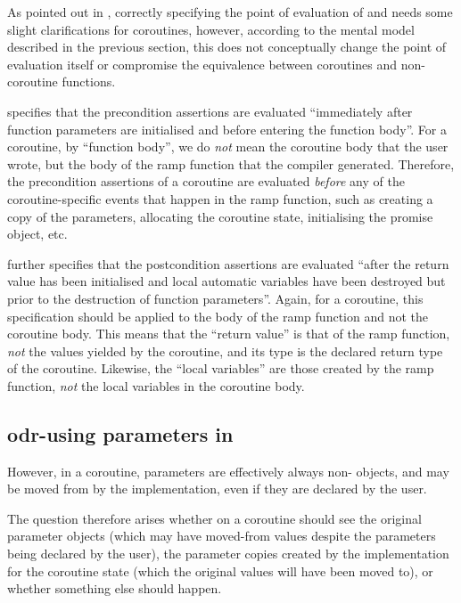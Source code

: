 As pointed out in \cite{P2957R1}, correctly specifying the point of evaluation of  and  needs some slight clarifications for coroutines, however, according to the mental model described in the previous section, this does not conceptually change the point of evaluation itself or compromise the equivalence between coroutines and non-coroutine functions.

\cite{P2900R8} specifies that the precondition assertions are evaluated ``immediately after function parameters are initialised and before entering the function body''. For a coroutine, by ``function body'', we do \emph{not} mean the coroutine body that the user wrote, but the body of the ramp function that the compiler generated. Therefore, the precondition assertions of a coroutine are evaluated \emph{before} any of the coroutine-specific events that happen in the ramp function, such as creating a copy of the parameters, allocating the coroutine state, initialising the promise object, etc.

\cite{P2900R8} further specifies that the postcondition assertions are evaluated ``after the return value has been initialised and local automatic variables have been destroyed but prior to the destruction of function parameters''. Again, for a coroutine, this specification should be applied to the body of the ramp function and not the coroutine body. This means that the ``return value'' is that of the ramp function, \emph{not} the values yielded by the coroutine, and its type is the declared return type of the coroutine. Likewise, the ``local variables'' are those created by the ramp function, \emph{not} the local variables in the coroutine body.

\subsection{odr-using parameters in }
\label{paramsinpost}

However, in a coroutine, parameters are effectively always non- objects, and may be moved from by the implementation, even if they are declared  by the user.

The question therefore arises whether  on a coroutine should see the original parameter objects (which may have moved-from values despite the parameters being declared  by the user), the parameter copies created by the implementation for the coroutine state (which the original values will have been moved to), or whether something else should happen.

